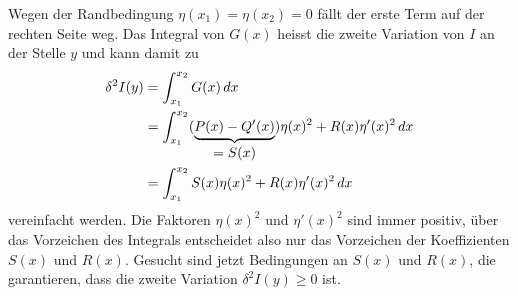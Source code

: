 Wegen der Randbedingung $\eta(x_1)=\eta(x_2)=0$ fällt der
erste Term auf der rechten Seite weg.
Das Integral von $G(x)$ heisst die zweite Variation von $I$ an der
Stelle $y$ und kann damit zu
\begin{align}
\delta^2 I(y)
&=
\int_{x_1}^{x_2} G(x)\,dx
\notag
\\
&=
\int_{x_1}^{x_2}
(\underbrace{P(x)-Q'(x)}_{\displaystyle = S(x)}) \eta(x)^2
+
R(x)\eta'(x)^2
\,dx
\notag
\\
&=
\int_{x_1}^{x_2}
S(x)\eta(x)^2 + R(x)\eta'(x)^2
\,dx
\label{buch:variation2:zweitevariation:eqn:SRintegral}
\end{align}
vereinfacht werden.
Die Faktoren $\eta(x)^2$ und $\eta'(x)^2$ sind immer positiv,
über das Vorzeichen des Integrals entscheidet also nur das Vorzeichen
der Koeffizienten $S(x)$ und $R(x)$.
Gesucht sind jetzt Bedingungen an $S(x)$ und $R(x)$, die garantieren,
dass die zweite Variation $\delta^2 I(y)\ge 0$ ist.


